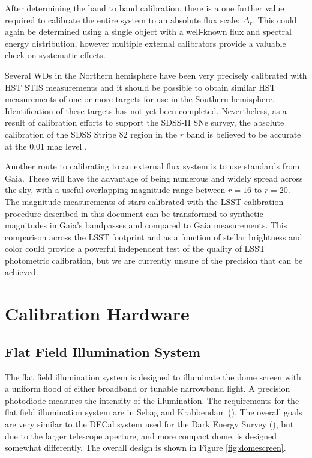\documentclass[12pt,preprint]{aastex}
\begin{document}
After determining the band to band calibration, there is a one further
value required to calibrate the entire system to an absolute flux
scale: $\Delta_r$.  This could again be determined using a single
object with a well-known flux and spectral energy distribution,
however multiple external calibrators provide a valuable check on
systematic effects. 

Several WDs in the Northern hemisphere have been very precisely
calibrated with HST STIS measurements \citep{2004AJ....128.3053B} and
it should be possible to obtain similar HST measurements of one or
more targets for use in the Southern hemisphere. Identification of
these targets has not yet been completed. Nevertheless, as a result of
calibration efforts to support the SDSS-II SNe survey, the absolute
calibration of the SDSS Stripe 82 region in the $r$ band is believed
to be accurate at the 0.01 mag level \citep{Frieman2008}. 

Another route to calibrating to an external flux system is to use
standards from Gaia. These will have the advantage of being numerous
and widely spread across the sky, with a useful overlapping magnitude range between
$r=16$ to $r=20$.  The magnitude measurements of stars calibrated with
the LSST calibration procedure described in this document can be
transformed to synthetic magnitudes in Gaia's bandpasses and compared
to Gaia measurements. 
This comparison across the LSST footprint and as
a function of stellar brightness and color could provide a powerful
independent test of the quality of LSST photometric calibration, but we
are currently unsure of the precision that can be achieved. 

\section{Calibration Hardware}
\label{sec:calib_hardware}

\subsection{Flat Field Illumination System}
The flat field illumination system is designed to illuminate the dome screen with a uniform flood of either 
broadband or tunable narrowband light.  A precision photodiode measures the intensity of the illumination.  
The requirements for the flat field illumination system are in Sebag and Krabbendam (\citep{LSE-60}).  The overall
goals are very similar to the DECal system used for the Dark Energy Survey (\citep{Marshall2013}), but due to the 
larger telescope aperture, and more compact dome, is designed somewhat differently.   The overall design is shown
in Figure \ref{fig:domescreen}.
\end{document}
